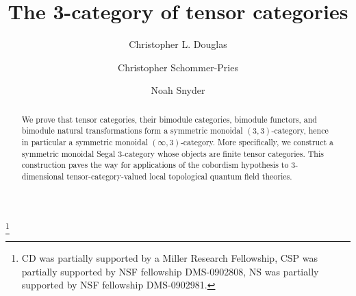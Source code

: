\documentclass[a4paper]{amsart}
\begin{document}
\title{The 3-category of tensor categories}

\begin{abstract}
We prove that tensor categories, their bimodule categories, bimodule functors, and bimodule natural transformations form a symmetric monoidal $(3,3)$-category, hence in particular a symmetric monoidal $(\infty,3)$-category. More specifically, we construct a symmetric monoidal Segal $3$-category whose objects are finite tensor categories.  This construction paves the way for applications of the cobordism hypothesis to $3$-dimensional tensor-category-valued local topological quantum field theories.
\end{abstract}
	
\author{Christopher L. Douglas}
\address{Mathematical Institute\\ University of Oxford\\ Oxford OX1 3LB\\ United Kingdom}
      	

\author{Christopher Schommer-Pries}
\address{Department of Mathematics\\ Massachusetts Institute of Technology\\ Cambridge, MA 02139\\ USA}

\author{Noah Snyder}
\address{Department of Mathematics\\ Columbia University\\ New York, NY 10027\\ USA}

\thanks{CD was partially supported by a Miller Research Fellowship, CSP was partially supported by NSF fellowship DMS-0902808,  NS was partially supported by NSF fellowship DMS-0902981.
}

\maketitle


\tikzexternaldisable
{}
\end{document}
